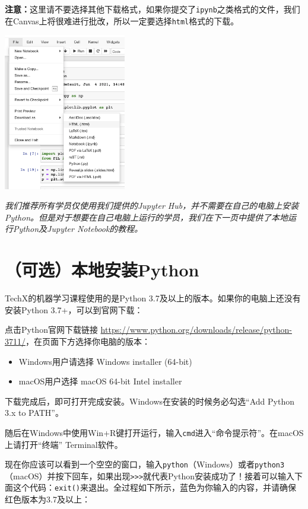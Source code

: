 \documentclass{article}
\begin{document}
  \textbf{注意：}这里请不要选择其他下载格式，如果你提交了\texttt{ipynb}之类格式的文件，我们在Canvas上将很难进行批改，所以一定要选择\texttt{html}格式的下载。
  
  \vspace*{0.3cm}\centerline{\noindent\includegraphics[width=0.4\textwidth]{notebook-download.png}}

\vspace{2em}
\emph{我们推荐所有学员仅使用我们提供的Jupyter Hub，并不需要在自己的电脑上安装Python。但是对于想要在自己电脑上运行的学员，我们在下一页中提供了本地运行Python及Jupyter Notebook的教程。}

\newpage
\section{（可选）本地安装Python}
TechX的机器学习课程使用的是Python 3.7及以上的版本。如果你的电脑上还没有安装Python 3.7+，可以到官网下载：

点击Python官网下载链接 \url{https://www.python.org/downloads/release/python-3711/}，在页面下方选择你电脑的版本：
\begin{itemize}
\item
Windows用户请选择 Windows installer (64-bit)
\item
macOS用户选择 macOS 64-bit Intel installer
\end{itemize}
下载完成后，即可打开完成安装。Windows在安装的时候务必勾选“Add Python 3.x to PATH”。

随后在Windows中使用Win+R键打开运行，输入\texttt{cmd}进入“命令提示符”。在macOS上请打开“终端” Terminal软件。

现在你应该可以看到一个空空的窗口，输入\texttt{python}（Windows）或者\texttt{python3}（macOS）并按下回车，如果出现\texttt{>>>}就代表Python安装成功了！接着可以输入下面这个代码：\texttt{exit()}来退出。全过程如下所示，蓝色为你输入的内容，并请确保红色版本为3.7及以上：
\end{document}
